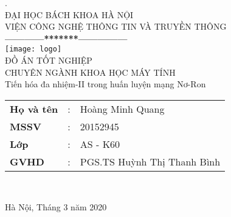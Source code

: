 \thispagestyle{empty}

\thisfancypage{
  \setlength{\fboxrule}{1pt}
  \doublebox}{}
\begin{center}

{
. \\
{\fontsize{12}{12}\selectfont ĐẠI HỌC BÁCH KHOA HÀ NỘI\\VIỆN CÔNG NGHỆ THÔNG TIN VÀ TRUYỀN THÔNG}\\
\textbf{------------*******---------------}\\[1cm]
\texttt{[image: logo]}
\centering
\\[1cm]
{\fontsize{25}{43}\selectfont ĐỒ ÁN TỐT NGHIỆP}\\[0.1cm]
{\fontsize{17}{10}\selectfont CHUYÊN NGÀNH KHOA HỌC MÁY TÍNH}\\[0.9cm]
{\fontsize{20}{26}\selectfont Tiến hóa đa nhiệm-II trong huấn luyện mạng Nơ-Ron}\\[2cm]

\begin{tabular}{l c l}
  \textbf{Họ và tên} & : & Hoàng Minh Quang \\ 
  \textbf{MSSV} & : & 20152945  \\ 
  \textbf{Lớp} & : & AS - K60  \\
  \textbf{GVHD} & : &  PGS.TS Huỳnh Thị Thanh Bình  \\
\end{tabular} \\[1.5cm]
}

\fontsize{17}{19}\selectfont Hà Nội, Tháng 3 năm 2020
\end{center}
\pagebreak
